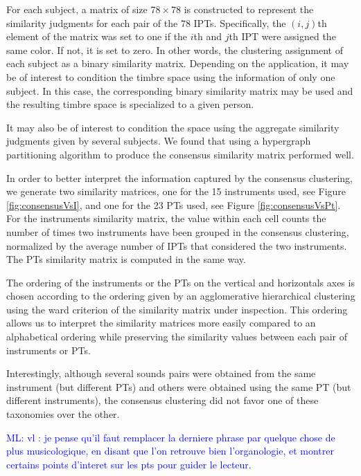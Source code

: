 \documentclass{bmcart}
\newcommand{\ml}[1]{\textcolor{blue}{ML: #1}}
\begin{document}
For each subject, a matrix of size $78 \times 78$ is constructed to represent the similarity judgments for each pair of the $78$ IPTs.
Specifically, the $(i, j)$th element of the matrix was set to one if the $i$th and $j$th IPT were assigned the same color.
If not, it is set to zero.
In other words, the clustering assignment of each subject as a binary similarity matrix. Depending on the application, it may be of interest to condition the timbre space using the information of only one subject. In this case, the corresponding binary similarity matrix may be used and the resulting timbre space is specialized to a given person.


It may also be of interest to condition the space using the aggregate similarity judgments given by several subjects. We found that using a hypergraph partitioning algorithm \cite{kernighan1970efficient,han1997scalable,strehl2002cluster} to produce the consensus similarity matrix performed well.

In order to better interpret the information captured by the consensus clustering, we generate two similarity matrices, one for the 15 instruments used, see Figure \ref{fig:consensusVsI}, and one for the 23 PTs used, see Figure \ref{fig:consensusVsPt}. For the instruments similarity matrix, the value within each cell counts the number of times two instruments have been grouped in the consensus clustering, normalized by the average number of IPTs that considered the two instruments. The PTs similarity matrix is computed in the same way.

The ordering of the instruments or the PTs on the vertical and horizontals axes is chosen according to the ordering given by an agglomerative hierarchical clustering using the ward criterion of the similarity matrix under inspection. This ordering allows us to interpret the similarity matrices more easily compared to an alphabetical ordering while preserving the  similarity values between each pair of instruments or PTs.

Interestingly, although several sounds pairs were obtained from the same instrument (but different PTs) and others were obtained using the same PT (but different instruments), the consensus clustering did not favor one of these taxonomies over the other.

\ml{vl : je pense qu'il faut remplacer la derniere phrase par quelque chose de plus musicologique, en disant que l'on retrouve bien l'organologie, et montrer certains points d'interet sur les pts pour guider le lecteur.}
\end{document}
